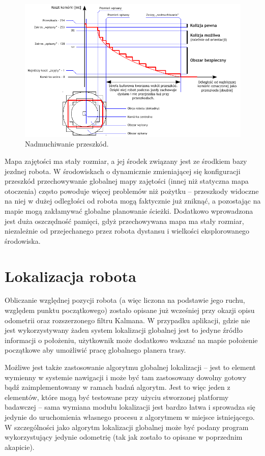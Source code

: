 \begin{figure}[htb!]
\centering
\includegraphics[width=15cm]{../../Common/img/ros/inflate.pdf}
\caption{Nadmuchiwanie przeszkód.}
\label{fig:inflation}
\end{figure}

Mapa zajętości ma stały rozmiar, a jej środek związany jest ze środkiem bazy
jezdnej robota. W środowiskach o dynamicznie zmieniającej się konfiguracji
przeszkód przechowywanie globalnej mapy zajętości (innej niż statyczna mapa
otoczenia) często powoduje więcej problemów niż pożytku -- przeszkody widoczne
na niej w dużej odległości od robota mogą faktycznie już zniknąć, a pozostając
na mapie mogą zakłamywać globalne planowanie ścieżki. Dodatkowo wprowadzona jest
duża oszczędność pamięci, gdyż przechowywana mapa ma stały rozmiar, niezależnie
od przejechanego przez robota dystansu i wielkości eksplorowanego środowiska.

\section{Lokalizacja robota}

Obliczanie względnej pozycji robota (a więc liczona na podstawie jego ruchu, względem
punktu początkowego) zostało opisane już wcześniej przy okazji opisu odometrii
oraz rozszerzonego filtru Kalmana. W przypadku aplikacji, gdzie nie jest wykorzystywany
żaden system lokalizacji globalnej jest to jedyne źródło informacji o położeniu,
użytkownik może dodatkowo wskazać na mapie położenie początkowe aby umożliwić pracę
globalnego planera trasy.

Możliwe jest także zastosowanie algorytmu globalnej lokalizacji -- jest to element
wymienny w systemie nawigacji i może być tam zastosowany dowolny gotowy bądź zaimplementowany
w ramach badań algorytm. Jest to więc jeden z elementów, które mogą być testowane
przy użyciu stworzonej platformy badawczej -- sama wymiana modułu lokalizacji jest
bardzo łatwa i sprowadza się jedynie do uruchomienia własnego procesu z algorytmem
w miejsce istniejącego. W szczególności jako algorytm lokalizacji globalnej może być
podany program wykorzystujący jedynie odometrię (tak jak zostało to opisane w poprzednim
akapicie).

